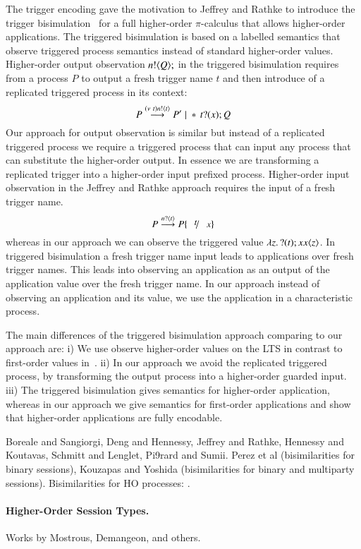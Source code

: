 The trigger encoding gave the motivation to Jeffrey and
Rathke to introduce the trigger bisimulation~\cite{DBLP:journals/lmcs/JeffreyR05}
for a full higher-order $\pi$-calculus that allows
higher-order applications.
The triggered bisimulation is based on a labelled semantics
that observe triggered process semantics instead of standard
higher-order values.
Higher-order output observation $n ! \langle Q \rangle ;$ in the
triggered bisimulation requires from
a process $P$ to output a fresh
trigger name $t$ and then introduce of a replicated triggered process
in its context:
\[
	P \stackrel{(\nu\ t) n ! \langle t \rangle}{\longrightarrow} P' \;|\; \ast\,{} t ? (x) ; Q
\]
Our approach for output observation is similar but instead of 
a replicated triggered process we require a triggered process that 
can input any process that can substitute the higher-order output.
In essence we are transforming a replicated trigger into a higher-order
input prefixed process.
Higher-order input observation in the Jeffrey and Rathke approach requires 
the input of a fresh trigger name.
\[
	P \by{\bactinp{n}{t}} P \subst{t}{x} 
\]
whereas in our approach we can observe the triggered value
$\lambda z.\,? (t) ;{x} x\langle z \rangle$.
In triggered bisimulation a fresh trigger name input leads to applications over
fresh trigger names. This leads into observing an application
as an output of the application value over the fresh trigger name.
In our approach instead of observing an application and its value,
we use the application in a characteristic process.

The main differences of the triggered
bisimulation approach comparing to our approach are:
i) We use observe higher-order values on the LTS in contrast to first-order 
values in~\cite{DBLP:journals/lmcs/JeffreyR05}.
ii) In our approach we avoid the replicated triggered process,
by transforming the output process into a higher-order guarded input.
iii) The triggered bisimulation gives semantics for higher-order application,
whereas in our approach we give semantics for first-order applications
and show that higher-order applications are fully encodable.


Boreale and Sangiorgi, 
Deng and Hennessy, 
Jeffrey and Rathke, Hennessy and Koutavas, Schmitt and Lenglet, Pi\E9rard and Sumii.
Perez et al (bisimilarities for binary sessions), Kouzapas and Yoshida (bisimilarities for binary and multiparty sessions).
Bisimilarities for HO processes: \cite{Xu07}.

\paragraph{Higher-Order Session Types.}
Works by Mostrous, Demangeon, and others.
